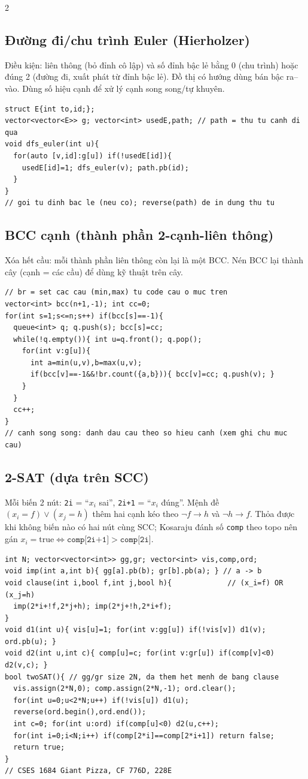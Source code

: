 \documentclass[8pt]{extarticle}
\begin{document}
\begin{multicols}{2}
\subsection{Đường đi/chu trình Euler (Hierholzer)}
Điều kiện: liên thông (bỏ đỉnh cô lập) và số đỉnh bậc lẻ bằng 0 (chu trình) hoặc đúng 2 (đường đi, xuất phát từ đỉnh bậc lẻ). Đồ thị có hướng dùng bán bậc ra--vào. Dùng số hiệu cạnh để xử lý cạnh song song/tự khuyên.
\begin{lstlisting}
struct E{int to,id;};
vector<vector<E>> g; vector<int> usedE,path; // path = thu tu canh di qua
void dfs_euler(int u){
  for(auto [v,id]:g[u]) if(!usedE[id]){
    usedE[id]=1; dfs_euler(v); path.pb(id);
  }
}
// goi tu dinh bac le (neu co); reverse(path) de in dung thu tu
\end{lstlisting}

\subsection{BCC cạnh (thành phần 2-cạnh-liên thông)}
Xóa hết cầu: mỗi thành phần liên thông còn lại là một BCC. Nén BCC lại thành cây (cạnh = các cầu) để dùng kỹ thuật trên cây.
\begin{lstlisting}
// br = set cac cau (min,max) tu code cau o muc tren
vector<int> bcc(n+1,-1); int cc=0;
for(int s=1;s<=n;s++) if(bcc[s]==-1){
  queue<int> q; q.push(s); bcc[s]=cc;
  while(!q.empty()){ int u=q.front(); q.pop();
    for(int v:g[u]){
      int a=min(u,v),b=max(u,v);
      if(bcc[v]==-1&&!br.count({a,b})){ bcc[v]=cc; q.push(v); }
    }
  }
  cc++;
}
// canh song song: danh dau cau theo so hieu canh (xem ghi chu muc cau)
\end{lstlisting}

\subsection{2-SAT (dựa trên SCC)}
Mỗi biến 2 nút: \texttt{2i} = ``$x_i$ sai'', \texttt{2i+1} = ``$x_i$ đúng''. Mệnh đề $(x_i{=}f)\lor(x_j{=}h)$ thêm hai cạnh kéo theo $\lnot f\to h$ và $\lnot h\to f$. Thỏa được khi không biến nào có hai nút cùng SCC; Kosaraju đánh số \texttt{comp} theo topo nên gán $x_i{=}\text{true} \iff \texttt{comp[2i+1]} > \texttt{comp[2i]}$.
\begin{lstlisting}
int N; vector<vector<int>> gg,gr; vector<int> vis,comp,ord;
void imp(int a,int b){ gg[a].pb(b); gr[b].pb(a); } // a -> b
void clause(int i,bool f,int j,bool h){             // (x_i=f) OR (x_j=h)
  imp(2*i+!f,2*j+h); imp(2*j+!h,2*i+f);
}
void d1(int u){ vis[u]=1; for(int v:gg[u]) if(!vis[v]) d1(v); ord.pb(u); }
void d2(int u,int c){ comp[u]=c; for(int v:gr[u]) if(comp[v]<0) d2(v,c); }
bool twoSAT(){ // gg/gr size 2N, da them het menh de bang clause
  vis.assign(2*N,0); comp.assign(2*N,-1); ord.clear();
  for(int u=0;u<2*N;u++) if(!vis[u]) d1(u);
  reverse(ord.begin(),ord.end());
  int c=0; for(int u:ord) if(comp[u]<0) d2(u,c++);
  for(int i=0;i<N;i++) if(comp[2*i]==comp[2*i+1]) return false;
  return true;
}
// CSES 1684 Giant Pizza, CF 776D, 228E
\end{lstlisting}


\end{multicols}
\end{document}
